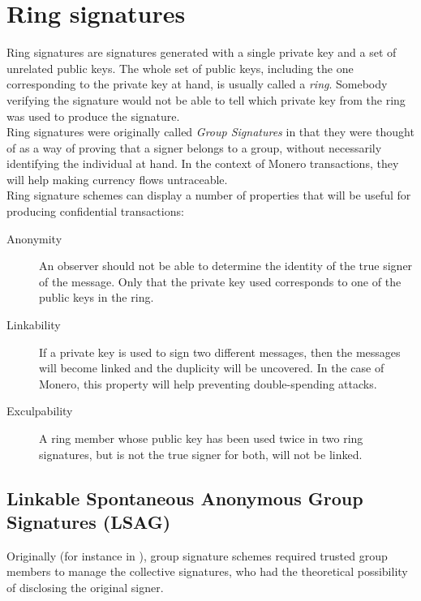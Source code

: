 
\chapter{Ring signatures}
\label{chapter:ring-signatures}


Ring signatures are signatures generated with a single private key and a set of unrelated public keys.
The whole set of public keys, including the one corresponding to the private key at hand, is usually called a {\em ring}.
Somebody verifying the signature would not be able to tell which private key from the ring was used to produce the
signature.
\\

Ring signatures were originally called {\em Group Signatures} in that they were thought of as a way of proving that a signer belongs to a group, without necessarily identifying the individual at hand.
In the context of Monero transactions, they will help making currency flows untraceable.
\\

Ring signature schemes can display a number of properties that will be useful for producing confidential transactions:

\begin{description}
	
	\item[Anonymity] 
	An observer should not be able to determine the identity of the true signer of the message. Only that the private key used corresponds to one of the public keys in the ring.
	
		
	\item[Linkability] 
	If a private key is used to sign two different messages, then the messages will become linked and the duplicity will be  uncovered. In the case of Monero, this property will help preventing double-spending attacks.
	 
	 
	\item[Exculpability]
    A ring member whose public key has been used twice in two ring signatures, but is not the true signer for both, will not be linked.
	
\end{description}




\section{Linkable Spontaneous Anonymous Group Signatures (LSAG)}

Originally (for instance in \cite{Chaum:1991:GS:1754868.1754897}), group  signature schemes required trusted group members to manage the collective signatures, who had the theoretical possibility of disclosing the original signer.

